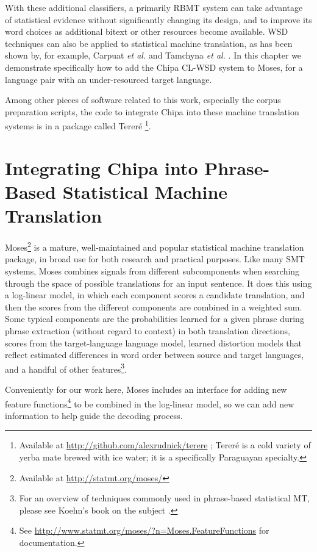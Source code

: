 With these additional classifiers, a primarily RBMT system can take advantage
of statistical evidence without significantly changing its design, and to
improve its word choices as additional bitext or other resources become
available.
WSD techniques can also be applied to statistical machine translation, as has
been shown by, for example, Carpuat \emph{et al.} \cite{carpuatpsd} and Tamchyna
\emph{et al.} \cite{tamchyna2014integrating}. In this chapter we demonstrate
specifically how to add the Chipa CL-WSD system to Moses, for a language pair
with an under-resourced target language.

Among other pieces of software related to this work, especially the corpus
preparation scripts, the code to integrate Chipa into these machine
translation systems is in a package called Tereré \footnote{Available at
\url{http://github.com/alexrudnick/terere} ; Tereré is a cold variety of yerba
mate brewed with ice water; it is a specifically Paraguayan specialty.}.


\section{Integrating Chipa into Phrase-Based Statistical Machine Translation}
Moses\footnote{Available at \url{http://statmt.org/moses/}} is a mature,
well-maintained and popular statistical machine translation package, in broad
use for both research and practical purposes.
Like many SMT systems, Moses combines signals from different subcomponents when
searching through the space of possible translations for an input sentence. It
does this using a log-linear model, in which each component scores a candidate
translation, and then the scores from the different components are combined in
a weighted sum. Some typical components are the probabilities learned for a
given phrase during phrase extraction (without regard to context) in both
translation directions, scores from the target-language language model, learned
distortion models that reflect estimated differences in word order between
source and target languages, and a handful of other features\footnote{For an
overview of techniques commonly used in phrase-based statistical MT, please see
Koehn's book on the subject \cite{koehn2010statistical}.}.

Conveniently for our work here, Moses includes an interface for adding new
feature functions\footnote{See
\url{http://www.statmt.org/moses/?n=Moses.FeatureFunctions} for documentation.}
to be combined in the log-linear model, so we can add new information to help
guide the decoding process.

